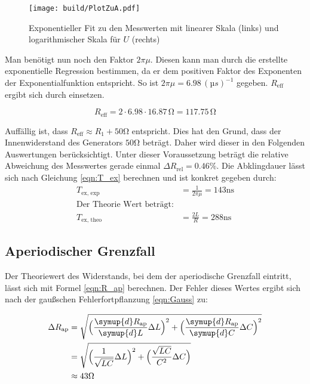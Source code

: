 \begin{figure}
  \centering
  \texttt{[image: build/PlotZuA.pdf]}
  \caption{Exponentieller Fit \cite{scipy} zu den Messwerten mit linearer Skala (links) und logarithmischer Skala für $U$ (rechts)}
  \label{fig:PlotZuA}
\end{figure}

Man benötigt nun noch den Faktor $2\pi\mu$. Diesen kann man durch die erstellte exponentielle Regression 
bestimmen, da er dem positiven Faktor des Exponenten der Exponentialfunktion entspricht. 
So ist $2\pi\mu = 6.98\, (µs)^{-1}$ gegeben.
$R_{\text{eff}}$ ergibt sich durch einsetzen.

\begin{equation*}
  R_{\text{eff}} = 2\cdot 6.98\cdot 16.87\,\unit{\ohm} = 117.75\,\unit{\ohm}
\end{equation*}

Auffällig ist, dass $R_{\text{eff}} \approx R_1 + 50\unit{\ohm}$ entspricht. Dies hat den Grund, dass der Innenwiderstand des Generators
$50 \unit{\ohm}$ beträgt. Daher wird dieser in den Folgenden Auswertungen berücksichtigt. Unter dieser Voraussetzung beträgt die relative Abweichung des Messwertes
gerade einmal $\Delta R_{\text{rel}} = 0.46\%$.
Die Abklingdauer lässt sich nach Gleichung \eqref{eqn:T_ex} berechnen und ist konkret gegeben durch:
\begin{align*}
  T_{\text{ex, exp}} &= \frac{1}{2\pi\mu} = 143 \unit{\nano\second} \\
  \text{Der Theorie Wert beträgt:} \\
  T_{\text{ex, theo}} &= \frac{2L}{R} = 288 \unit{\nano\second}
\end{align*}

\subsection{Aperiodischer Grenzfall}
\label{subsec:AuswertungB}

Der Theoriewert des Widerstands, bei dem der aperiodische Grenzfall eintritt, lässt sich mit Formel \eqref{eqn:R_ap} berechnen.
Der Fehler dieses Wertes ergibt sich nach der gaußschen Fehlerfortpflanzung \eqref{eqn:Gauss} zu:

\begin{align*}
  \label{eqn:err_R_ap}
  \Delta R_{\text{ap}} &= \sqrt{\Bigl(\frac{\symup{d}R_{\text{ap}}}{\symup{d}L}\Delta L \Bigr)^2+\Bigl(\frac{\symup{d}R_{\text{ap}}}{\symup{d}C}\Delta C\Bigr)^2} \\
  &= \sqrt{\Bigl(\frac{1}{\sqrt{LC}}\Delta L\Bigr)^2+\Bigl(\frac{\sqrt{LC}}{C^2}\Delta C\Bigr)} \\
  &\approx 43 \unit{\ohm}
\end{align*}

